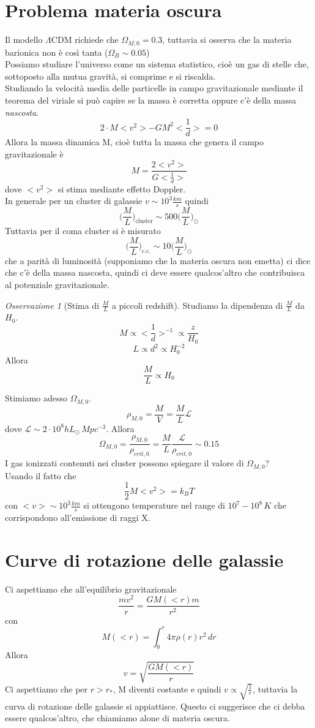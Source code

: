 \documentclass[10pt,a4paper]{article}
\let\oldmarginpar\marginpar
\renewcommand\marginpar[1]{\-\oldmarginpar[\raggedleft\footnotesize #1]%
	{\raggedright\footnotesize #1}}
\theoremstyle{break}
\theoremstyle{remark}
\newtheorem{oss}{Osservazione}
\theoremstyle{definition}
\begin{document}
\section{Problema materia oscura}
Il modello $\Lambda$CDM richiede che $\Omega_{M, 0} = 0.3$, tuttavia si osserva che la materia barionica non è così tanta ($\Omega_B \sim 0.05$) \\
Possiamo studiare l'universo come un sistema statistico, cioè un gas di stelle che, sottoposto alla mutua gravità, si comprime e si riscalda. \\
Studiando la velocità media delle particelle in campo gravitazionale mediante il teorema del viriale si può capire se la massa è corretta oppure c'è della massa \textit{nascosta}.
\[
2\cdot M <v^2> -  G M^2 <\frac1d> = 0
\]
Allora la massa dinamica M, cioè tutta la massa che genera il campo gravitazionale è
\[
M = \frac{2 <v^2>}{G <\frac1d>}
\]
dove $<v^2>$ si stima mediante effetto Doppler. \\
In generale per un cluster di galassie $v \sim 10^3 \frac{km}{s}$ quindi 
\[
\bigg(\frac{M}{L}\bigg)_{\text{cluster}} \sim 500\bigg(\frac{M}{L}\bigg)_\odot
\]
Tuttavia per il coma cluster si è misurato 
\[
\bigg(\frac{M}{L}\bigg)_{\text{c.c.}} \sim 10\bigg(\frac{M}{L}\bigg)_\odot
\]
che a parità di luminosità (supponiamo che la materia oscura non emetta) ci dice che c'è della massa nascosta, quindi ci deve essere qualcos'altro che contribuisca al potenziale gravitazionale.
\begin{oss}[Stima di $\frac{M}{L}$ a piccoli redshift]
	Studiamo la dipendenza di $\frac{M}{L}$ da $H_0$.\\
	\[
	M \propto <\frac1d>^{-1} \propto \frac{z}{H_0}
	\]
	\marginpar{Dalla legge di Hubble $H_0 d = z$}
	\[
	L \propto d^2 \propto H_0^{-2}
	\]
	Allora
	\[
	\frac{M}{L} \propto H_0
	\]
\end{oss}

Stimiamo adesso $\Omega_{M, 0}$.
\[
\rho_{M, 0} = \frac{M}{V} = \frac{M}{L} \mathcal{L}
\]
dove $\mathcal{L} \sim 2\cdot 10^8 h L_\odot\, Mpc^{-3}$. Allora
\[
\Omega_{M, 0} = \frac{\rho_{M, 0}}{\rho_{crit, 0}} = \frac{M}{L} \frac{\mathcal{L}}{\rho_{crit, 0}} \sim 0.15
\]
I gas ionizzati contenuti nei cluster possono spiegare il valore di $\Omega_{M, 0}$?\\
Usando il fatto che 
\[
\frac12 M <v^2> = k_B T
\]
con $<v> \sim 10^3 \frac{km}{s}$ si ottengono temperature nel range di $10^7 - 10^8 \, K$ che corrispondono all'emissione di raggi X.
\section{Curve di rotazione delle galassie}
Ci aspettiamo che all'equilibrio gravitazionale 
\[
\frac{m v^2}{r} = \frac{G M(<r)m}{r^2}
\]
con 
\[
M(<r) = \int_{0}^{r} 4 \pi \rho(r) r^2 \, dr
\]
Allora 
\[
v = \sqrt{\frac{G M(<r)}{r}}
\]
Ci aspettiamo che per $r > r_*$, M diventi costante e quindi $v \propto \sqrt{\frac1r}$, tuttavia la curva di rotazione delle galassie si appiattisce. Questo ci suggerisce che ci debba essere qualcos'altro, che chiamiamo alone di materia oscura.
\end{document}
